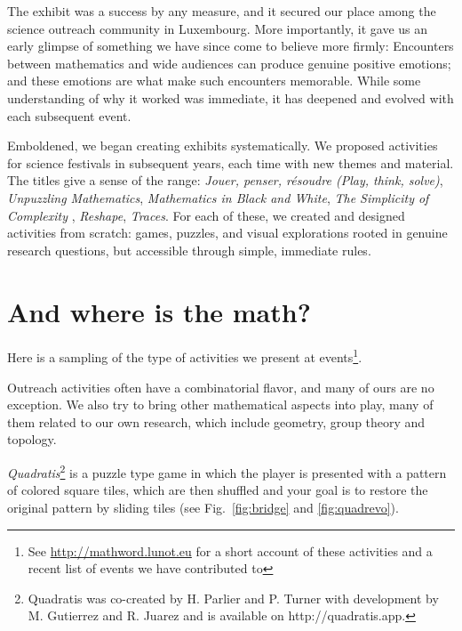 \documentclass{notices}
\begin{document}
The exhibit was a success by any measure, and it secured our place among the science outreach community in Luxembourg. More importantly, it gave us an early glimpse of something we have since come to believe more firmly: Encounters between mathematics and wide audiences can produce genuine positive emotions; and these emotions are what make such encounters memorable. While some understanding of why it worked was immediate, it has deepened and evolved with each subsequent event.



Emboldened, we began creating exhibits systematically. We proposed activities for science festivals in subsequent years, each time with new themes and material. The titles give a sense of the range: \textit{Jouer, penser, r\'esoudre (Play, think, solve)}, \textit{Unpuzzling Mathematics}, \textit{Mathematics in Black and White}, \textit{The Simplicity of Complexity} , \textit{Reshape},  \textit{Traces}. For each of these, we created and designed activities from scratch: games, puzzles, and visual explorations rooted in genuine research questions, but accessible through simple, immediate rules.

\section*{And where is the math?}

Here is a sampling of the type of activities we present at events\footnote{See \url{http://mathword.lunot.eu} for a short account of these activities and a recent list of events we have contributed to}.

Outreach activities often have a combinatorial flavor, and many of ours are no exception. We also try to bring other mathematical aspects into play, many of them related to our own research, which include geometry, group theory and topology. 

\textit{Quadratis}\footnote{Quadratis was co-created by H. Parlier and P. Turner with development by M. Gutierrez and R. Juarez and is available on http://quadratis.app.} is a puzzle type game in which the player is presented with a pattern of colored square tiles, which are then shuffled and your goal is to restore the original pattern by sliding tiles (see Fig.~\ref{fig:bridge} and \ref{fig:quadrevo}).
\end{document}
